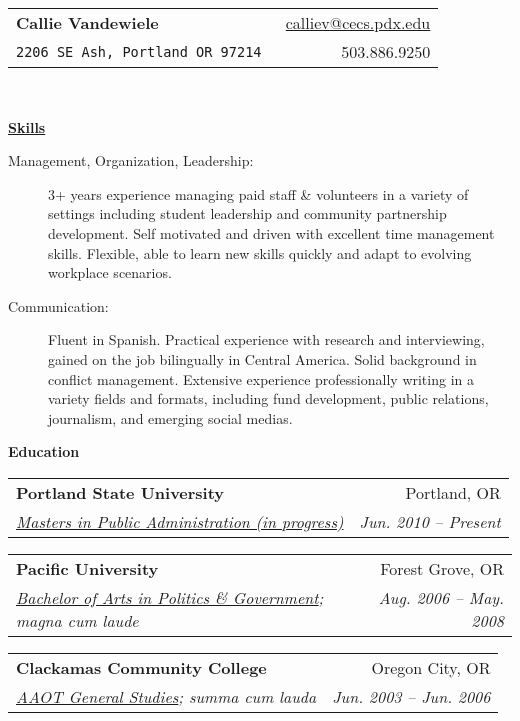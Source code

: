 \documentclass[letterpaper,11pt]{article}
\makeatletter
\newcommand{\resheading}[1]{{\large \colorbox{mygrey}{\begin{minipage}{\textwidth}{\textbf{#1 \vphantom{p\^{E}}}}\end{minipage}}}}
\newcommand{\ressubheading}[4]{
\begin{tabular*}{6.75in}{l@{\extracolsep{\fill}}r}
		\textbf{#1} & #2 \\
		\textit{#3} & \textit{#4} \\
\end{tabular*}\vspace{-6pt}}
\makeatother
\begin{document}
\newcommand{\mywebheader}{
\begin{tabular*}{7in}{l@{\extracolsep{\fill}}r}
	\textbf{\LARGE \textcolor{mygreylink}{Callie Vandewiele}} & \href{mailto:calliev@gmail.com}{calliev@cecs.pdx.edu}\\
	{\footnotesize \texttt{2206 SE Ash, Portland OR 97214 }} & \textcolor{mygreylink}{{503.886.9250}} \\
	\end{tabular*}
\\
\vspace{0.1in}}

\mywebheader


\resheading{\href{http://www.derekhildreth.com/portfolio.php}{Skills}}
	\begin{description}
		\item[Management, Organization, Leadership:] {\footnotesize  3+ years experience managing paid staff \& volunteers in a variety of settings including student leadership and community partnership development. Self motivated and driven with excellent time management skills.  Flexible, able to learn new skills quickly and adapt to evolving workplace scenarios.}
        \item[Communication:] { \footnotesize Fluent in Spanish.  Practical experience with research and interviewing, gained on the job bilingually in Central America. Solid background in conflict management. Extensive experience professionally writing in a variety fields and formats, including fund development, public relations, journalism, and emerging social medias.}

	\end{description} %


\resheading{Education}
	\begin{description}
		\item
			\ressubheading{Portland State University}{Portland, OR}{\href{http://www.pdx.edu/hatfieldschool/division-public-administratio}{Masters in Public Administration (in progress)} \textcolor{mygreylink}{}}{Jun. 2010 -- Present}
		\item
			\ressubheading{Pacific University}{Forest Grove, OR}{\href{http://www.pacificu.edu/as/politics}{Bachelor of Arts in Politics \& Government}; \textcolor{mygreylink}{magna cum laude}}{Aug. 2006 -- May. 2008}
		\item
			\ressubheading{Clackamas Community College}{Oregon City, OR}{\href{http://www.clackamas.edu/index.aspx}{AAOT General Studies}; \textcolor{mygreylink}{summa cum lauda}}{Jun. 2003 -- Jun. 2006}
	\end{description} %
\end{document}
